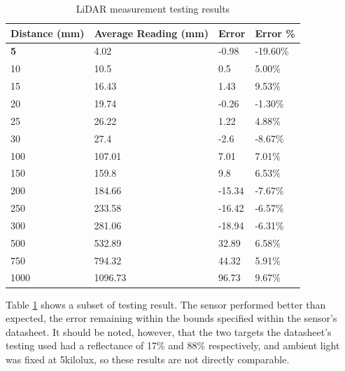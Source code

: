 \documentclass [12pt]{article}
\begin{document}
\begin{table}[]
    \begin{tabular}{|l|l|l|l|}
    \hline
    \textbf{Distance (mm)} & \textbf{Average Reading (mm)} & \textbf{Error} & \textbf{Error \%} \\ \hline
    \textbf{5}             & 4.02                          & -0.98          & -19.60\%          \\ \hline
    10                     & 10.5                          & 0.5            & 5.00\%            \\ \hline
    15                     & 16.43                         & 1.43           & 9.53\%            \\ \hline
    20                     & 19.74                         & -0.26          & -1.30\%           \\ \hline
    25                     & 26.22                         & 1.22           & 4.88\%            \\ \hline
    30                     & 27.4                          & -2.6           & -8.67\%           \\ \hline
    100                    & 107.01                        & 7.01           & 7.01\%            \\ \hline
    150                    & 159.8                         & 9.8            & 6.53\%            \\ \hline
    200                    & 184.66                        & -15.34         & -7.67\%           \\ \hline
    250                    & 233.58                        & -16.42         & -6.57\%           \\ \hline
    300                    & 281.06                        & -18.94         & -6.31\%           \\ \hline
    500                    & 532.89                        & 32.89          & 6.58\%            \\ \hline
    750                    & 794.32                        & 44.32          & 5.91\%            \\ \hline
    1000                   & 1096.73                       & 96.73          & 9.67\%            \\ \hline
    \end{tabular}
    \caption{LiDAR measurement testing results}
    \label{tab:lidar_res}
    \end{table}

Table \ref{tab:lidar_res} shows a subset of testing result. The sensor performed better than expected, the error remaining within the bounds specified within the sensor’s datasheet. It should be noted, however, that the two targets the datasheet’s testing used had a reflectance of 17\% and 88\% respectively, and ambient light was fixed at 5kilolux, so these results are not directly comparable.
\end{document}
